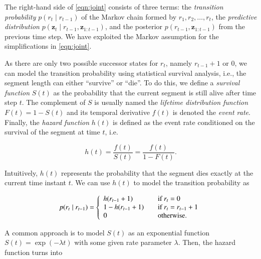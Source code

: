 The right-hand side of \eqref{eqn:joint} consists of three terms: the
\emph{transition probability} $p(r_t\mid r_{t-1})$ of the Markov chain formed by
$r_1,r_2,\dots,r_t$, the \emph{predictive distribution}
$p(\mathbf{z}_t\mid r_{t-1},\mathbf{z}_{1:t-1})$, and the posterior
$p(r_{t-1},\mathbf{z}_{1:t-1})$ from the previous time step. We have exploited
the Markov assumption for the simplifications in \eqref{eqn:joint}.


As there are only two possible successor states for $r_t$, namely
\mbox{$r_{t-1}+1$} or $0$, we can model the transition probability using
statistical survival analysis, i.e., the segment length can
either ``survive'' or ``die''. To do this, we define a \emph{survival function}
$S(t)$ as the probability that the current segment is still alive after time
step $t$. The complement of $S$ is usually named the
\emph{lifetime distribution function} $F(t)= 1- S(t)$ and its temporal
derivative $f(t)$ is denoted the \emph{event rate}. Finally, the
\emph{hazard function} $h(t)$ is defined as the event rate conditioned on the
survival of the segment at time $t$, i.e.

\begin{equation}
\label{eqn:hazardfunc}
h(t) = \frac{f(t)}{S(t)} = \frac{f(t)}{1 - F(t)}.
\end{equation}

Intuitively, $h(t)$ represents the probability that the segment dies exactly at
the current time instant $t$. We can use $h(t)$ to model the transition
probability as

\begin{equation}
\label{eqn:transprob}
p(r_t\mid r_{t-1}) = \left\{
\begin{array}{l l}
h(r_{t-1}+1) & \quad \text{if $r_t=0$ }\\
1 - h(r_{t-1}+1) & \quad \text{if $r_t=r_{t-1}+1$}\\
0 & \quad \text{otherwise}.
\end{array} \right.
\end{equation}

A common approach is to model $S(t)$ as an exponential function
$S(t)=\exp(-\lambda t)$ with some given rate parameter $\lambda$. Then, the
hazard function turns into

